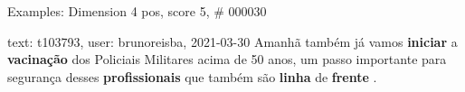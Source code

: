 \begin{frame}{Examples: Dimension 4 pos, score 5, \# 000030}
\footnotesize
\begin{exampleblock}{text: t103793, user: brunoreisba, 2021-03-30}
Amanhã também já vamos \textbf{iniciar} a \textbf{vacinação} dos Policiais 
Militares acima de 50 anos, um passo importante para segurança desses 
\textbf{profissionais} que também são \textbf{linha} de \textbf{frente} . 
\end{exampleblock}
\end{frame}

